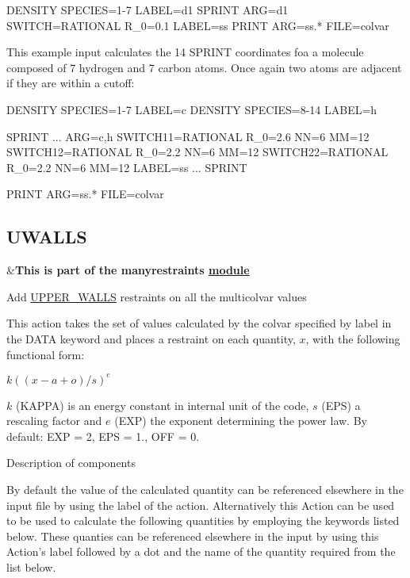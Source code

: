 \begin{DoxyVerb}DENSITY SPECIES=1-7 LABEL=d1
SPRINT ARG=d1 SWITCH={RATIONAL R_0=0.1} LABEL=ss
PRINT ARG=ss.* FILE=colvar 
\end{DoxyVerb}


This example input calculates the 14 S\+P\+R\+I\+N\+T coordinates foa a molecule composed of 7 hydrogen and 7 carbon atoms. Once again two atoms are adjacent if they are within a cutoff\+:

\begin{DoxyVerb}DENSITY SPECIES=1-7 LABEL=c
DENSITY SPECIES=8-14 LABEL=h

SPRINT ...
 ARG=c,h
 SWITCH11={RATIONAL R_0=2.6 NN=6 MM=12}
 SWITCH12={RATIONAL R_0=2.2 NN=6 MM=12}
 SWITCH22={RATIONAL R_0=2.2 NN=6 MM=12}
 LABEL=ss
... SPRINT

PRINT ARG=ss.* FILE=colvar
\end{DoxyVerb}
 \hypertarget{UWALLS}{}\subsection{U\+W\+A\+L\+L\+S}\label{UWALLS}
\begin{TabularC}{2}
\hline
&{\bfseries  This is part of the manyrestraints \hyperlink{mymodules}{module }}   \\
\end{TabularC}
Add \hyperlink{UPPER_WALLS}{U\+P\+P\+E\+R\+\_\+\+W\+A\+L\+L\+S} restraints on all the multicolvar values

This action takes the set of values calculated by the colvar specified by label in the D\+A\+T\+A keyword and places a restraint on each quantity, $x$, with the following functional form\+:

$ k((x-a+o)/s)^e $

$k$ (K\+A\+P\+P\+A) is an energy constant in internal unit of the code, $s$ (E\+P\+S) a rescaling factor and $e$ (E\+X\+P) the exponent determining the power law. By default\+: E\+X\+P = 2, E\+P\+S = 1., O\+F\+F = 0.

\begin{DoxyParagraph}{Description of components}

\end{DoxyParagraph}
By default the value of the calculated quantity can be referenced elsewhere in the input file by using the label of the action. Alternatively this Action can be used to be used to calculate the following quantities by employing the keywords listed below. These quanties can be referenced elsewhere in the input by using this Action's label followed by a dot and the name of the quantity required from the list below.

